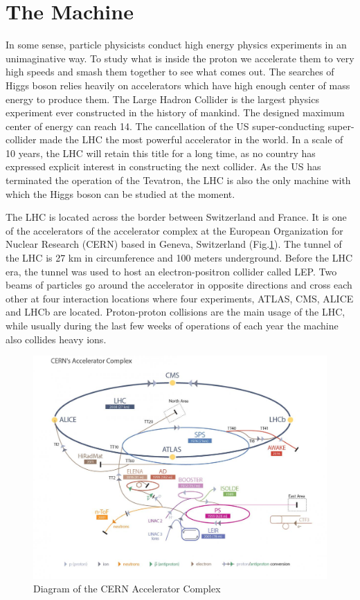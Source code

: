\section{The Machine}

In some sense, particle physicists conduct high energy physics experiments in an unimaginative way. To study what is inside the proton we accelerate them to very high speeds and smash them together to see what comes out. The searches of Higgs boson relies heavily on accelerators which have high enough center of mass energy to produce them. The Large Hadron Collider is the largest physics experiment ever constructed in the history of mankind. The designed maximum center of energy can reach 14\tev. The cancellation of the US super-conducting super-collider made the LHC the most powerful accelerator in the world. In a scale of 10 years, the LHC will retain this title for a long time, as no country has expressed explicit interest in constructing the next collider. As the US has terminated the operation of the Tevatron, the LHC is also the only machine with which the Higgs boson can be studied at the moment.

The LHC is located across the border between Switzerland and France. It is one of the accelerators of the accelerator complex at the European Organization for Nuclear Research (CERN) based in Geneva, Switzerland (Fig.\ref{fig:lhc-CERN}). The tunnel of the LHC is 27 km in circumference and 100 meters underground. Before the LHC era, the tunnel was used to host an electron-positron collider called LEP\cite{refneeded}. Two beams of particles go around the accelerator in opposite directions and cross each other at four interaction locations where four experiments, ATLAS, CMS, ALICE and LHCb are located. Proton-proton collisions are the main usage of the LHC, while usually during the last few weeks of operations of each year the machine also collides heavy ions.

\begin{figure}[htpb!]
\begin{center}
  \includegraphics[width=0.7\linewidth]{figures/LHC/LHC_default}
\caption{Diagram of the CERN Accelerator Complex}
\label{fig:lhc-CERN}
\end{center}
\end{figure}


